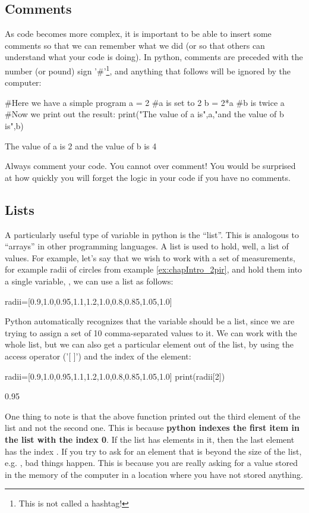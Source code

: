 \subsection{Comments}
As code becomes more complex, it is important to be able to insert some comments so that we can remember what we did (or so that others can understand what your code is doing). In python, comments are preceded with the number (or pound) sign '\#'\footnote{This is not called a hashtag!}, and anything that follows will be ignored by the computer:
\begin{python}[caption=Using comments]
#Here we have a simple program 
a = 2 #a is set to 2
b = 2*a #b is twice a
#Now we print out the result:
print("The value of a is",a,"and the value of b is",b)
\end{python}
\begin{poutput}
The value of a is 2 and the value of b is 4
\end{poutput}
Always comment your code. You cannot over comment! You would be surprised at how quickly you will forget the logic in your code if you have no comments.
\subsection{Lists}
A particularly useful type of variable in python is the ``list''. This is analogous to ``arrays'' in other programming languages. A list is used to hold, well, a list of values. For example, let's say that we wish to work with a set of measurements, for example radii of circles from example \ref{ex:chapIntro_2pir}, and hold them into a single variable, , we can use a list as follows:
\begin{python}[caption = \mbox{}]
radii=[0.9,1.0,0.95,1.1,1.2,1.0,0.8,0.85,1.05,1.0]
\end{python}
Python automatically recognizes that the variable  should be a list, since we are trying to assign a set of 10 comma-separated values to it. We can work with the whole list, but we can also get a particular element out of the list, by using the access operator ('{[ ]}') and the index of the element:
\begin{python}[caption = \mbox{}]
radii=[0.9,1.0,0.95,1.1,1.2,1.0,0.8,0.85,1.05,1.0]
print(radii[2])
\end{python}
\begin{poutput}
0.95
\end{poutput}
One thing to note is that the above  function printed out the third element of the list and not the second one. This is because \textbf{python indexes the first item in the list with the index 0}. If the list has  elements in it, then the last element has the index . If you try to ask for an element that is beyond the size of the list, e.g. , bad things happen. This is because you are really asking for a value stored in the memory of the computer in a location where you have not stored anything. 

